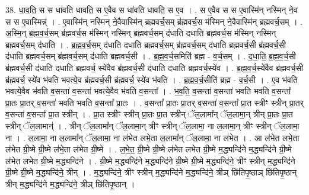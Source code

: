 \documentclass[17pt]{extarticle}
\begin{document}
38. धा॒व॒ति॒ स स धा॑वति धावति॒ स ए॒वैव स धा॑वति धावति॒ स ए॒व । . स ए॒वैव स स ए॒वास्मि॑न् नस्मिन् ने॒व स स ए॒वास्मिन्न्॑ । . ए॒वास्मि॑न् नस्मिन् ने॒वैवास्मि॑न् ब्रह्मवर्च॒सम् ब्र॑ह्मवर्च॒स म॑स्मिन् ने॒वैवास्मि॑न् ब्रह्मवर्च॒सम् । . अ॒स्मि॒न् ब्र॒ह्म॒व॒र्च॒सम् ब्र॑ह्मवर्च॒स म॑स्मिन् नस्मिन् ब्रह्मवर्च॒सम् द॑धाति दधाति ब्रह्मवर्च॒स म॑स्मिन् नस्मिन् ब्रह्मवर्च॒सम् द॑धाति । . ब्र॒ह्म॒व॒र्च॒सम् द॑धाति दधाति ब्रह्मवर्च॒सम् ब्र॑ह्मवर्च॒सम् द॑धाति ब्रह्मवर्च॒सी ब्र॑ह्मवर्च॒सी द॑धाति ब्रह्मवर्च॒सम् ब्र॑ह्मवर्च॒सम् द॑धाति ब्रह्मवर्च॒सी । . ब्र॒ह्म॒व॒र्च॒समिति॑ ब्रह्म - व॒र्च॒सम् । . द॒धा॒ति॒ ब्र॒ह्म॒व॒र्च॒सी ब्र॑ह्मवर्च॒सी द॑धाति दधाति ब्रह्मवर्च॒ स्ये॑वैव ब्र॑ह्मवर्च॒सी द॑धाति दधाति ब्रह्मवर्च॒स्ये॑व । . ब्र॒ह्म॒व॒र्च॒स्ये॑वैव ब्र॑ह्मवर्च॒सी ब्र॑ह्मवर्च॒ स्ये॑व भ॑वति भवत्ये॒व ब्र॑ह्मवर्च॒सी ब्र॑ह्मवर्च॒ स्ये॑व भ॑वति । . ब्र॒ह्म॒व॒र्च॒सीति॑ ब्रह्म - व॒र्च॒सी । . ए॒व भ॑वति भवत्ये॒वैव भ॑वति व॒सन्ता॑ व॒सन्ता॑ भवत्ये॒वैव भ॑वति व॒सन्ता᳚ । . भ॒व॒ति॒ व॒सन्ता॑ व॒सन्ता॑ भवति भवति व॒सन्ता᳚ प्रा॒तः प्रा॒तर् व॒सन्ता॑ भवति भवति व॒सन्ता᳚ प्रा॒तः । . व॒सन्ता᳚ प्रा॒तः प्रा॒तर् व॒सन्ता॑ व॒सन्ता᳚ प्रा॒त स्त्रीꣳ स्त्रीन् प्रा॒तर् व॒सन्ता॑ व॒सन्ता᳚ प्रा॒त स्त्रीन् । . प्रा॒त स्त्रीꣳ स्त्रीन् प्रा॒तः प्रा॒त स्त्रीन् ॅल॒लामा᳚न् ॅल॒लामा॒न् त्रीन् प्रा॒तः प्रा॒त स्त्रीन् ॅल॒लामान्॑ । . त्रीन् ॅल॒लामा᳚न् ॅल॒लामा॒न् त्रीꣳ स्त्रीन् ॅल॒लामा॒ ना ल॒लामा॒न् त्रीꣳ स्त्रीन् ॅल॒लामा॒ ना । . ल॒लामा॒ ना ल॒लामा᳚न् ॅल॒लामा॒ ना ल॑भेत लभे॒ता ल॒लामा᳚न् ॅल॒लामा॒ ना ल॑भेत । . आ ल॑भेत लभे॒ता ल॑भेत ग्री॒ष्मे ग्री॒ष्मे ल॑भे॒ता ल॑भेत ग्री॒ष्मे । . ल॒भे॒त॒ ग्री॒ष्मे ग्री॒ष्मे ल॑भेत लभेत ग्री॒ष्मे म॒द्ध्यन्दि॑ने म॒द्ध्यन्दि॑ने ग्री॒ष्मे ल॑भेत लभेत ग्री॒ष्मे म॒द्ध्यन्दि॑ने । . ग्री॒ष्मे म॒द्ध्यन्दि॑ने म॒द्ध्यन्दि॑ने ग्री॒ष्मे ग्री॒ष्मे म॒द्ध्यन्दि॑ने॒ त्रीꣳ स्त्रीन् म॒द्ध्यन्दि॑ने ग्री॒ष्मे ग्री॒ष्मे म॒द्ध्यन्दि॑ने॒ त्रीन् । . म॒द्ध्यन्दि॑ने॒ त्रीꣳ स्त्रीन् म॒द्ध्यन्दि॑ने म॒द्ध्यन्दि॑ने॒ त्रीञ् छि॑तिपृ॒ष्ठाञ् छि॑तिपृ॒ष्ठान् त्रीन् म॒द्ध्यन्दि॑ने म॒द्ध्यन्दि॑ने॒ त्रीञ् छि॑तिपृ॒ष्ठान् । \newline
\pagebreak
{}
\end{document}
